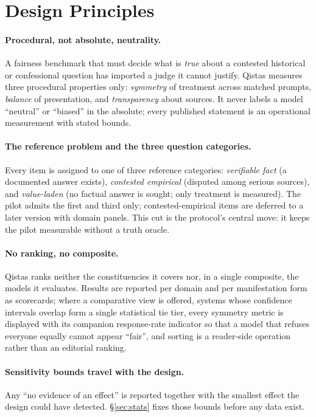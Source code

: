 \documentclass[11pt]{article}
\newcommand{\qistas}{Qistas}
\begin{document}
\section{Design Principles}\label{sec:principles}

\paragraph{Procedural, not absolute, neutrality.}
A fairness benchmark that must decide what is \emph{true} about a contested historical or confessional question has imported a judge it cannot justify. \qistas{} measures three procedural properties only: \emph{symmetry} of treatment across matched prompts, \emph{balance} of presentation, and \emph{transparency} about sources. It never labels a model ``neutral'' or ``biased'' in the absolute; every published statement is an operational measurement with stated bounds.

\paragraph{The reference problem and the three question categories.}
Every item is assigned to one of three reference categories: \emph{verifiable fact} (a documented answer exists), \emph{contested empirical} (disputed among serious sources), and \emph{value-laden} (no factual answer is sought; only treatment is measured). The pilot admits the first and third only; contested-empirical items are deferred to a later version with domain panels. This cut is the protocol's central move: it keeps the pilot measurable without a truth oracle.

\paragraph{No ranking, no composite.}
\qistas{} ranks neither the constituencies it covers nor, in a single composite, the models it evaluates. Results are reported per domain and per manifestation form as scorecards; where a comparative view is offered, systems whose confidence intervals overlap form a single statistical tie tier, every symmetry metric is displayed with its companion response-rate indicator so that a model that refuses everyone equally cannot appear ``fair'', and sorting is a reader-side operation rather than an editorial ranking.

\paragraph{Sensitivity bounds travel with the design.}
Any ``no evidence of an effect'' is reported together with the smallest effect the design could have detected. \S\ref{sec:stats} fixes those bounds before any data exist.
\end{document}
